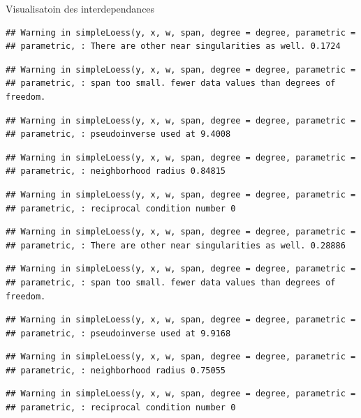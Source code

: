 \documentclass[11pt,ignorenonframetext,]{beamer}
\begin{document}
\begin{frame}[fragile]{Visualisatoin des interdependances}
\begin{verbatim}
## Warning in simpleLoess(y, x, w, span, degree = degree, parametric =
## parametric, : There are other near singularities as well. 0.1724
\end{verbatim}

\begin{verbatim}
## Warning in simpleLoess(y, x, w, span, degree = degree, parametric =
## parametric, : span too small. fewer data values than degrees of freedom.
\end{verbatim}

\begin{verbatim}
## Warning in simpleLoess(y, x, w, span, degree = degree, parametric =
## parametric, : pseudoinverse used at 9.4008
\end{verbatim}

\begin{verbatim}
## Warning in simpleLoess(y, x, w, span, degree = degree, parametric =
## parametric, : neighborhood radius 0.84815
\end{verbatim}

\begin{verbatim}
## Warning in simpleLoess(y, x, w, span, degree = degree, parametric =
## parametric, : reciprocal condition number 0
\end{verbatim}

\begin{verbatim}
## Warning in simpleLoess(y, x, w, span, degree = degree, parametric =
## parametric, : There are other near singularities as well. 0.28886
\end{verbatim}

\begin{verbatim}
## Warning in simpleLoess(y, x, w, span, degree = degree, parametric =
## parametric, : span too small. fewer data values than degrees of freedom.
\end{verbatim}

\begin{verbatim}
## Warning in simpleLoess(y, x, w, span, degree = degree, parametric =
## parametric, : pseudoinverse used at 9.9168
\end{verbatim}

\begin{verbatim}
## Warning in simpleLoess(y, x, w, span, degree = degree, parametric =
## parametric, : neighborhood radius 0.75055
\end{verbatim}

\begin{verbatim}
## Warning in simpleLoess(y, x, w, span, degree = degree, parametric =
## parametric, : reciprocal condition number 0
\end{verbatim}


\end{frame}
\end{document}
